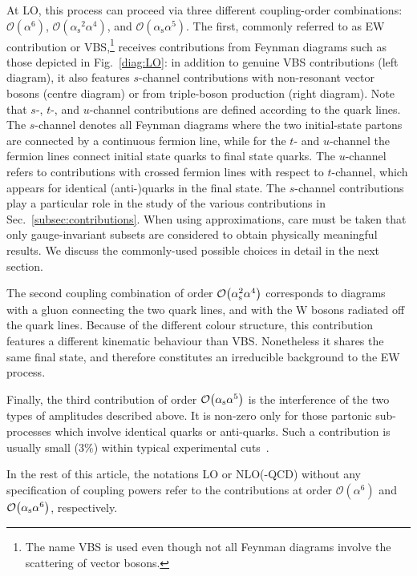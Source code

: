 \documentclass[twocolumn,epjc3]{svjour3} %
\newcommand{\PW}{\ensuremath{\text{W}}\xspace}
\newcommand{\alphas}{\ensuremath{\alpha_\text{s}}\xspace}
\begin{document}
At LO, this process can proceed via three different coupling-order combinations:
$\mathcal{O}{\left(\alpha^{6}\right)}$, $\mathcal{O}{\left(\alphas^{2}\alpha^{4}\right)}$, and $\mathcal{O}{\left(\alphas\alpha^{5}\right)}$.
The first, commonly referred to as EW contribution or VBS,\footnote{The name VBS is used even though not all Feynman diagrams involve the scattering
of vector bosons.} receives contributions from Feynman diagrams such as those depicted in Fig.~\ref{diag:LO}:
in addition to genuine VBS contributions (left diagram), it also features $s$-channel contributions with non-resonant vector bosons 
(centre diagram) or from
triple-boson production (right diagram).
Note that $s$-, $t$-, and $u$-channel contributions are defined according to the quark lines.
The $s$-channel denotes all Feynman diagrams where the two initial-state partons are connected by a continuous fermion line, while for the $t$- and $u$-channel the fermion lines connect initial state quarks to final state quarks.
The $u$-channel refers to contributions with crossed fermion lines with respect to $t$-channel, which appears for identical (anti-)quarks in the final state.
The $s$-channel contributions play a particular role in the study of the various contributions in Sec.~\ref{subsec:contributions}.
When using approximations, care must be taken that only gauge-invariant subsets are considered to obtain physically meaningful results.
We discuss the commonly-used possible choices in detail in the next section.

The second coupling combination of order $\mathcal{O}{\left(\alpha_{\rm s}^2\alpha^{4}\right)}$ corresponds to diagrams with a gluon connecting the two quark lines, and with the $\PW$ bosons 
radiated off the quark lines. Because of the different colour structure, this contribution features a 
different kinematic behaviour than VBS.
Nonetheless it shares the same final state, and therefore constitutes an irreducible background to the EW process.

Finally, the third contribution of order $\mathcal{O}{\left(\alpha_{\rm s}\alpha^{5}\right)}$ is the interference of the two types of amplitudes described above.
It is non-zero only for those partonic sub-processes which involve identical quarks or anti-quarks.
Such a contribution is usually small ($3\%$) within typical experimental cuts~\cite{Biedermann:2017bss}.

In the rest of this article, the notations LO or NLO(-QCD) without any specification of coupling powers refer to the contributions at order $\mathcal{O}{\left(\alpha^{6}\right)}$ and $\mathcal{O}{\left(\alpha_{\rm s}\alpha^{6}\right)}$, respectively.
\end{document}
